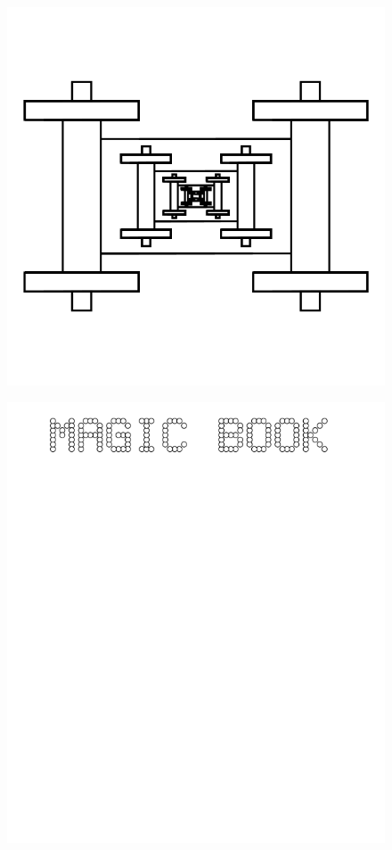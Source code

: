 \documentclass[17pt]{extreport}
\begin{document}
	\begin{figure}
		\centering
		\includegraphics[width=6.25in]{imageserver/uploadimages/image17.png}
	\end{figure}
	
	\begin{figure}
		\centering
		\includegraphics[width=6.25in]{imageserver/uploadimages/magicbook.png}
	\end{figure}
	
\end{document}
